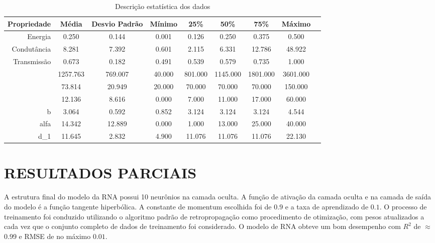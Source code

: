 \documentclass[a4paper,12pt]{article}
\begin{document}
\begin{table}[!htb]
\centering
\caption{Descrição estatística dos dados}
\label{tab:analise_estatistica_dados}
\begin{adjustbox}{max width=\textwidth}
\begin{tabular}{rSSSSSSSS} 
\toprule
            \textbf{Propriedade} &  \textbf{Média}    & \textbf{Desvio Padrão}      & \textbf{Mínimo}     & \textbf{25\%}   & \textbf{50\%}    & \textbf{75\%}  &    \textbf{Máximo}  \\ 
\midrule
Energia        & 0.250    & 0.144   & 0.001  & 0.126   & 0.250    & 0.375    & 0.500         \\
Condutância   & 8.281    & 7.392   & 0.601  & 2.115   & 6.331    & 12.786   & 48.922        \\
Transmissão  & 0.673    & 0.182   & 0.491  & 0.539   & 0.579    & 0.735    & 1.000         \\
          & 1257.763 & 769.007 & 40.000 & 801.000 & 1145.000 & 1801.000 & 3601.000      \\
          & 73.814   & 20.949  & 20.000 & 70.000  & 70.000   & 70.000   & 150.000       \\
          & 12.136   & 8.616   & 0.000  & 7.000   & 11.000   & 17.000   & 60.000        \\
b             & 3.064    & 0.592   & 0.852  & 3.124   & 3.124    & 3.124    & 4.544         \\
alfa         & 14.342   & 12.889  & 0.000  & 1.000   & 13.000   & 25.000   & 40.000        \\
d_1            & 11.645   & 2.832   & 4.900  & 11.076  & 11.076   & 11.076   & 22.130        \\
\bottomrule
\end{tabular}
\end{adjustbox}
\end{table}

	\section{RESULTADOS PARCIAIS} \label{sec:part_result}
	A estrutura final do modelo da RNA possui 10 neurônios na camada oculta. A função de ativação da camada oculta e na camada de saída do modelo é a função tangente hiperbólica. A constante de momentum escolhida foi de $0.9$ e a taxa de aprendizado de $0.1$. O processo de treinamento foi conduzido utilizando o algoritmo padrão de retropropagação como procedimento de otimização, com pesos atualizados a cada vez que o conjunto completo de dados de treinamento foi considerado.
    O modelo de RNA obteve um bom desempenho com $R^2$ de $\approx$ 0.99 e RMSE de no máximo $0.01$.
\end{document}
